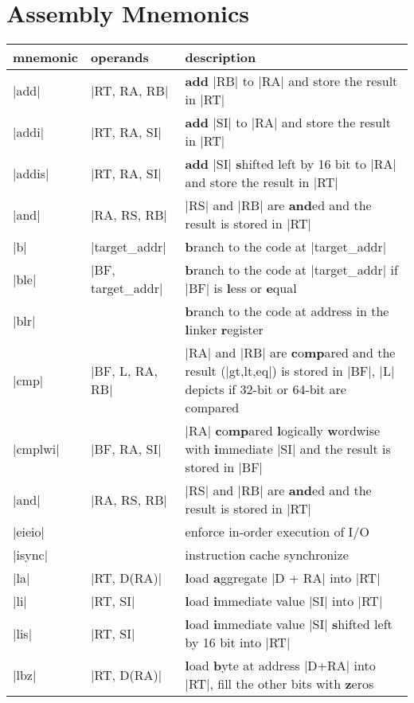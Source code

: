 \section{Assembly Mnemonics}
\label{sec:inlineasm}
\begin{table}[htbp]
\begin{tabular}{l l p{9cm}}
    mnemonic & operands & description \\
    \hline
    |add| & |RT, RA, RB| & \textbf{add} |RB| to |RA| and store the result in |RT| \\
    |addi| & |RT, RA, SI| & \textbf{add} |SI| to |RA| and store the result in |RT| \\
    |addis| & |RT, RA, SI| & \textbf{add} |SI| \textbf{s}hifted left by 16 bit to |RA| and store the result in |RT| \\
    |and| & |RA, RS, RB| & |RS| and |RB| are \textbf{and}ed and the result is stored in |RT| \\
    |b| & |target_addr| & \textbf{b}ranch to the code at |target_addr|\\
    |ble| & |BF, target_addr| & \textbf{b}ranch to the code at |target_addr| if |BF| is \textbf{l}ess or \textbf{e}qual \\
    |blr| & & \textbf{b}ranch to the code at address in the \textbf{l}inker \textbf{r}egister \\
    |cmp| & |BF, L, RA, RB| & |RA| and |RB| are \textbf{c}o\textbf{mp}ared and the result (|gt,lt,eq|) is stored in |BF|, |L| depicts if 32-bit or 64-bit are compared \\
    |cmplwi| & |BF, RA, SI| & |RA| \textbf{c}o\textbf{mp}ared \textbf{l}ogically \textbf{w}ordwise with \textbf{i}mmediate |SI| and the result is stored in |BF|\\
    |and| & |RA, RS, RB| & |RS| and |RB| are \textbf{and}ed and the result is stored in |RT| \\
    |eieio| & & enforce in-order execution of I/O\\
    |isync| & & instruction cache synchronize\\
    |la| & |RT, D(RA)| & \textbf{l}oad \textbf{a}ggregate |D + RA| into |RT|\\
    |li| & |RT, SI| & \textbf{l}oad \textbf{i}mmediate value |SI| into |RT|\\
    |lis| & |RT, SI| & \textbf{l}oad \textbf{i}mmediate value |SI| \textbf{s}hifted left by 16 bit into |RT|\\
    |lbz| & |RT, D(RA)| & \textbf{l}oad \textbf{b}yte at address |D+RA| into |RT|, fill the other bits with \textbf{z}eros \\

\end{tabular}
\end{table}
